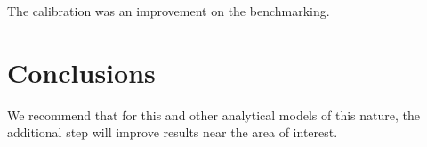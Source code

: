 \documentclass{anstrans}
\begin{document}


The calibration was an improvement on the benchmarking.

\section{Conclusions}

We recommend that for this and other analytical models of this nature, the 
additional step will improve results near the area of interest.



\end{document}
